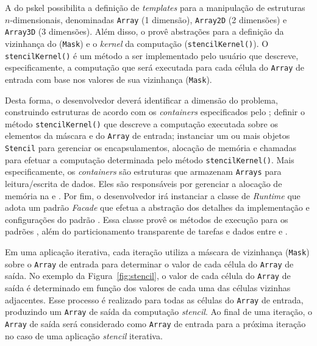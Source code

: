 A \api do pskel possibilita a definição de \textit{templates} para a manipulação
de estruturas $n$-dimensionais, denominadas \texttt{Array} (1 dimensão),
\texttt{Array2D} (2 dimensões) e \texttt{Array3D} (3 dimensões). Além disso, o
\fw provê abstrações para a definição da vizinhança do \stencil (\texttt{Mask})
e o \textit{kernel} da computação \stencil (\texttt{stencilKernel()}). O
\texttt{stencilKernel()} é um método a ser implementado pelo usuário que
descreve, especificamente, a computação que será executada para cada célula do
\texttt{Array} de entrada com base nos valores de sua vizinhança (\texttt{Mask}).

Desta forma, o desenvolvedor deverá identificar a dimensão do problema,
construindo estruturas de acordo com os \textit{containers} especificados pelo
\fw; definir o método \texttt{stencilKernel()} que descreve a computação executada
sobre os elementos da máscara e do \texttt{Array} de entrada; instanciar um ou
mais objetos \texttt{Stencil} para gerenciar os encapsulamentos, alocação de
memória e chamadas para efetuar a computação determinada pelo método
\texttt{stencilKernel()}. Mais especificamente, os \textit{containers} são
estruturas que armazenam \texttt{Arrays} para leitura/escrita de dados. Eles são
responsáveis por gerenciar a alocação de memória na \cpu e \gpu.
Por fim, o desenvolvedor irá instanciar a classe de \textit{Runtime} que adota
um padrão \textit{Facade} que efetua a abstração dos detalhes da implementação e
configurações do padrão \stencil. Essa classe provê os métodos de execução para
os padrões \stencil, além do particionamento transparente de tarefas e dados
entre \cpu e \gpu.

%

Em uma aplicação \stencil iterativa, cada iteração utiliza a máscara de
vizinhança (\texttt{Mask}) sobre o \texttt{Array} de entrada para determinar o
valor de cada célula do \texttt{Array} de saída. No exemplo da
Figura~\ref{fig:stencil}, o valor de cada célula do \texttt{Array} de saída é
determinado em função dos valores de cada uma das células vizinhas adjacentes.
Esse processo é realizado para todas as células do \texttt{Array} de entrada,
produzindo um \texttt{Array} de saída da computação \textit{stencil}. Ao final de uma
iteração, o \texttt{Array} de saída será considerado como \texttt{Array} de
entrada para a próxima iteração no caso de uma aplicação \textit{stencil} iterativa.

